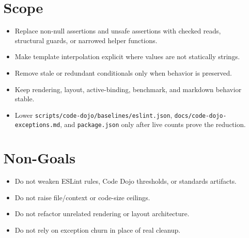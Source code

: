 \section{Scope}\label{record-220-scope}

\begin{itemize}
\tightlist
\item
  Replace non-null assertions and unsafe assertions with checked reads, structural guards, or narrowed helper functions.
\item
  Make template interpolation explicit where values are not statically strings.
\item
  Remove stale or redundant conditionals only when behavior is preserved.
\item
  Keep rendering, layout, active-binding, benchmark, and markdown behavior stable.
\item
  Lower \texttt{s\allowbreak{}c\allowbreak{}r\allowbreak{}i\allowbreak{}p\allowbreak{}t\allowbreak{}s\allowbreak{}/\allowbreak{}c\allowbreak{}o\allowbreak{}d\allowbreak{}e\allowbreak{}-\allowbreak{}d\allowbreak{}o\allowbreak{}j\allowbreak{}o\allowbreak{}/\allowbreak{}b\allowbreak{}a\allowbreak{}s\allowbreak{}e\allowbreak{}l\allowbreak{}i\allowbreak{}n\allowbreak{}e\allowbreak{}s\allowbreak{}/\allowbreak{}e\allowbreak{}s\allowbreak{}l\allowbreak{}i\allowbreak{}n\allowbreak{}t\allowbreak{}.\allowbreak{}j\allowbreak{}s\allowbreak{}o\allowbreak{}n}, \texttt{d\allowbreak{}o\allowbreak{}c\allowbreak{}s\allowbreak{}/\allowbreak{}c\allowbreak{}o\allowbreak{}d\allowbreak{}e\allowbreak{}-\allowbreak{}d\allowbreak{}o\allowbreak{}j\allowbreak{}o\allowbreak{}-\allowbreak{}e\allowbreak{}x\allowbreak{}c\allowbreak{}e\allowbreak{}p\allowbreak{}t\allowbreak{}i\allowbreak{}o\allowbreak{}n\allowbreak{}s\allowbreak{}.\allowbreak{}m\allowbreak{}d}, and \texttt{p\allowbreak{}a\allowbreak{}c\allowbreak{}k\allowbreak{}a\allowbreak{}g\allowbreak{}e\allowbreak{}.\allowbreak{}j\allowbreak{}s\allowbreak{}o\allowbreak{}n} only after live counts prove the reduction.
\end{itemize}

\section{Non-Goals}\label{record-220-non-goals}

\begin{itemize}
\tightlist
\item
  Do not weaken ESLint rules, Code Dojo thresholds, or standards artifacts.
\item
  Do not raise file/context or code-size ceilings.
\item
  Do not refactor unrelated rendering or layout architecture.
\item
  Do not rely on exception churn in place of real cleanup.
\end{itemize}

